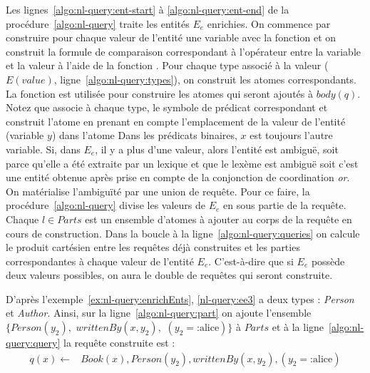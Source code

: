 Les lignes~\ref{algo:nl-query:ent-start} à \ref{algo:nl-query:ent-end} de la procédure~\ref{algo:nl-query} traite les entités $E_e$ enrichies.
On commence par construire pour chaque valeur de l'entité une variable avec la fonction \GetNewVar et on construit la formule de comparaison correspondant à l'opérateur entre la variable et la valeur à l'aide de la fonction \BuildAtomOP.
Pour chaque type associé à la valeur ($E(value)$, ligne~\ref{algo:nl-query:types}), on construit les atomes correspondants.
La fonction \BuildAtom est utilisée pour construire les atomes qui seront ajoutés à $body(q)$.
Notez que \BuildAtom associe à chaque type, le symbole de prédicat correspondant et construit l'atome en prenant en compte l'emplacement de la valeur de l'entité (variable $y$) dans l'atome
Dans les prédicats binaires, $x$ est toujours l'autre variable.
Si, dans $E_e$, il y a plus d'une valeur, alors l'entité est ambiguë, soit parce qu'elle a été extraite par un lexique et que le lexème est ambiguë soit c'est une entité obtenue après prise en compte de la conjonction de coordination \textit{or}.
On matérialise l'ambiguïté par une union de requête.
Pour ce faire, la procédure~\ref{algo:nl-query} divise les valeurs de $E_e$ en sous partie de la requête.
Chaque $l \in Parts$ est un ensemble d'atomes à ajouter au corps de la requête en cours de construction.
Dans la boucle à la ligne~\ref{algo:nl-query:queries} on calcule le produit cartésien entre les requêtes déjà construites et les parties correspondantes à chaque valeur de l'entité $E_e$.
C'est-à-dire que si $E_e$ possède deux valeurs possibles, on aura le double de requêtes qui seront construite.

D'après l'exemple~\ref{ex:nl-query:enrichEnts}, \ref{nl-query:ee3} a deux types : \emph{Person} et \emph{Author}.
Ainsi, sur la ligne~\ref{algo:nl-query:part} on ajoute l'ensemble $\{ Person(y_2),$ $writtenBy(x, y_2),$ $(y_2= \text{:alice}) \}$ à $Parts$ et à la ligne~\ref{algo:nl-query:query} la requête construite est :
\begin{equation*}
    \begin{split}
        q(x) \leftarrow & Book(x), Person(y_2), writtenBy(x, y_2), (y_2= \text{:alice})
    \end{split}
\end{equation*}

